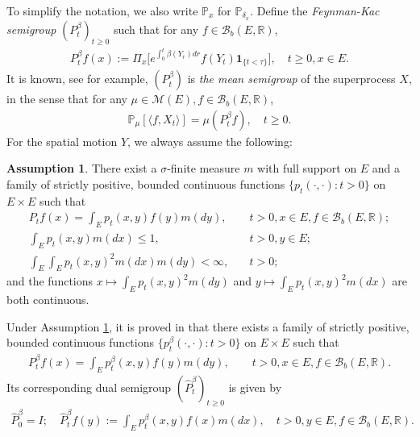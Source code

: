 \documentclass[12pt,a4paper]{amsart}
\numberwithin{equation}{section}
\theoremstyle{plain}
\theoremstyle{definition}
\newtheorem{asp}{Assumption}
\begin{document}
\par
To simplify the notation, we also write $\mathbb P_x$ for $\mathbb P_{\delta_x}$.
Define the \emph{Feynman-Kac semigroup} $(P^\beta_t)_{t\geq 0}$
such that for any $ f\in \mathcal B_b(E,\mathbb R)$,
\begin{align}
	P^\beta_tf(x)
	:= \Pi_x \big[e^{\int_0^{t} \beta(Y_r)dr} f(Y_t)\mathbf 1_{\{t<\tau\}}\big],
	\quad t\geq 0, x\in E.
\end{align}
It is known, see \cite[Proposition 2.27]{Li2011Measurevalued} for example, $(P^\beta_t)$ is \emph{the mean semigroup} of the superprocess $X$, in the sense that for any $\mu \in \mathcal M(E),f \in \mathcal B_b(E,\mathbb R)$,
\begin{align} \label{eq:Yaglom_type_result_without_2rd} 
\mathbb P_\mu [\langle f,X_t\rangle] = \mu(P^\beta_t f), \quad t \geq 0.
\end{align}
For the spatial motion $Y$, we always assume the following:
\begin{asp}
  \label{asp:1}
  There exist a $\sigma$-finite measure $m$ with full support on $E$ and a family
  of strictly positive, bounded continuous functions $\{ p_t(\cdot,\cdot): t > 0
  \}$ on $E \times E$ such that
  \begin{align}
  	P_tf(x)
  	= \int_E p_t(x,y) f(y) m(dy),
  	&\quad t>0, x \in E,f \in \mathcal B_b(E,\mathbb R);
  	\\ \int_E p_t(x,y)m(dx)\leq 1, &\quad t>0,y\in E;
  	\\ \int_E \int_E p_t(x,y)^2 m(dx) m(dy)
  	<\infty,
  	&\quad t> 0;
  \end{align}
  and the functions $x \mapsto \int_E p_t(x,y)^2 m(dy)$ and $y \mapsto \int_E
  p_t(x,y)^2 m(dx)$ are both continuous.
\end{asp}
\par
Under Assumption \ref{asp:1}, it is proved in
\cite{RenSongZhang2015Limit,RenSongZhang2017Central} that there exists a family
of strictly positive, bounded continuous functions $\{ p^\beta_t(\cdot,\cdot): t
> 0 \}$ on $E \times E$ such that
\begin{align}
	P^\beta_t f(x)
	= \int_E p_t^\beta (x,y) f(y) m(dy),
	\quad \quad t>0, x \in E,f \in \mathcal B_b(E,\mathbb R).
\end{align}
Its corresponding dual semigroup $(\widehat P^{\beta}_t)_{t \geq 0}$ is given by
\begin{align}
	\widehat P^{\beta}_0 = I;
	\quad \widehat P^{\beta}_t f(y)
	:= \int_E p^\beta_t (x,y) f(x) m(dx),
	\quad t>0, y\in E, f\in \mathcal B_b(E,\mathbb R).
\end{align}
\end{document}
